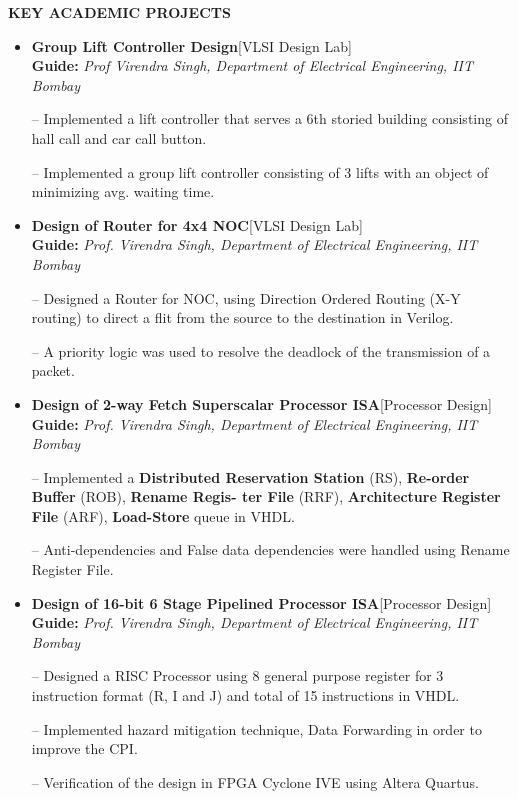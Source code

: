 \documentclass{article}
\newcommand{\hilight}[1]{\colorbox{light-gray}{#1}}
\def\vsp{6pt}
\begin{document}
\vspace{\vsp}
 \begin{theorem}
   \vspace{-0.7mm}
\begin{center}
\textbf{ KEY ACADEMIC PROJECTS
}\end{center}  
\vspace{-0.7mm}    
   \end{theorem}
\vspace{-3mm}
\begin{itemize}
\setlength{\itemsep}{-0.15em}
\item \textbf{Group Lift Controller Design}\hfill{\textcolor{pigment}{[VLSI Design Lab]}}\\
\textbf{Guide:} \textit{Prof Virendra Singh, Department of Electrical Engineering, IIT Bombay} 
\item[--] Implemented a lift controller that serves a 6th storied building consisting of hall call and car call button.
\item[--] Implemented a group lift controller consisting of 3 lifts with an object of minimizing avg. waiting time.
\item \textbf{Design of Router for 4x4 NOC}\hfill{\textcolor{pigment}{[VLSI Design Lab]}}\\
\textbf{Guide:} \textit{Prof. Virendra Singh, Department of Electrical Engineering, IIT Bombay} 
\item[--] Designed a Router for NOC, using Direction Ordered Routing (X-Y routing) to direct a flit from the source to the destination in Verilog. 
\item[--] A priority logic was used to resolve the deadlock of the transmission of a packet.
\item \textbf{Design of 2-way Fetch Superscalar Processor ISA}\hfill{\textcolor{pigment}{[Processor Design]}}\\
\textbf{Guide:} \textit{Prof. Virendra Singh, Department of Electrical Engineering, IIT Bombay} 
\item[--] Implemented a \textbf{Distributed Reservation Station} (RS), \textbf{Re-order Buffer} (ROB), \textbf{Rename Regis-
ter File} (RRF), \textbf{Architecture Register File} (ARF), \textbf{Load-Store} queue in VHDL.
\item[--] Anti-dependencies and False data dependencies were handled using Rename Register File.


\item \textbf{Design of 16-bit 6 Stage Pipelined Processor ISA}\hfill{\textcolor{pigment}{[Processor Design]}}\\
\textbf{Guide:} \textit{Prof. Virendra Singh, Department of Electrical Engineering, IIT Bombay} 
\item[--] Designed a RISC Processor using 8 general purpose register for 3 instruction format (R, I and J) and
total of 15 instructions in VHDL.
\item[--] Implemented hazard mitigation technique, Data Forwarding in order to improve the CPI.
\item[--] Verification of the design in FPGA Cyclone IVE using Altera Quartus.


\end{itemize}
\end{document}
